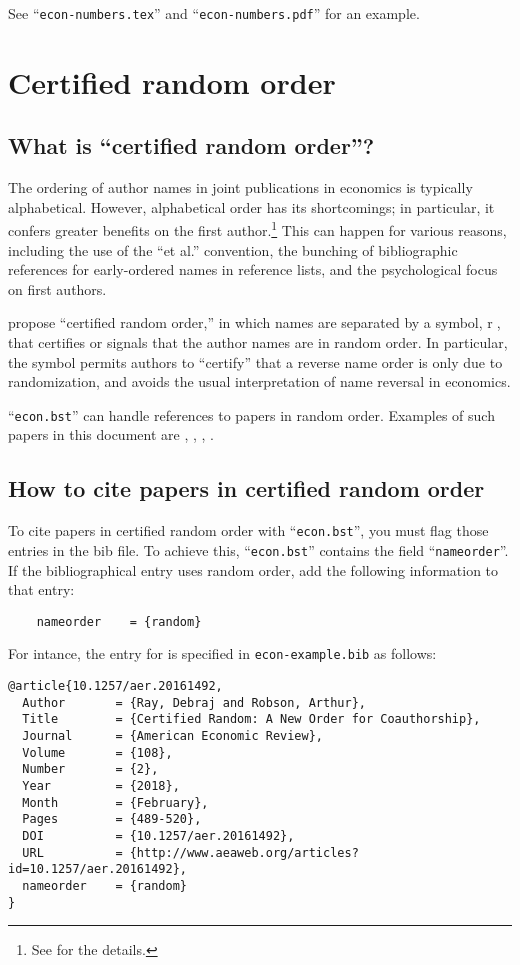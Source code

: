 \documentclass[10pt]{article}
\begin{document}
See ``\texttt{econ-numbers.tex}'' and ``\texttt{econ-numbers.pdf}'' for an example.

\section{Certified random order}
\label{sec:cro}

\subsection{What is ``certified random order''?}

The ordering of author names in joint publications in economics is typically
alphabetical.  However, alphabetical order has its shortcomings; in particular,
it confers greater benefits on the first author.\footnote{See
\citet{10.1257/aer.20161492} for the details.} This can happen for various
reasons, including the use of the ``et al.'' convention, the bunching of
bibliographic references for early-ordered names in reference lists, and the
psychological focus on first authors.

\citet{10.1257/aer.20161492} propose ``certified random order,'' in which names
are separated by a symbol, \textcircled{r}, that certifies or signals that the
author names are in random order. In particular, the symbol permits authors to
``certify'' that a reverse name order is only due to randomization, and avoids
the usual interpretation of name reversal in economics.

``\texttt{econ.bst}'' can handle references to papers in random order. Examples
of such papers in this document are \citet{10.1257/aer.20161492},
\citet{RePEc:hka:wpaper:2018-037}, \citet{vohra18:_maxim_farsig_stabl_set},
\citet{NBERw25205}.


\subsection{How to cite papers in certified random order}

To cite papers in certified random order with ``\texttt{econ.bst}'', you must
flag those entries in the bib file.  To achieve this, ``\texttt{econ.bst}''
contains the field ``\texttt{nameorder}''. If the bibliographical entry uses
random order, add the following information to that entry:
\begin{verbatim}
    nameorder    = {random}
\end{verbatim}

For intance, the entry for \citet{10.1257/aer.20161492} is specified in
\texttt{econ-example.bib} as follows:
\begin{verbatim}
@article{10.1257/aer.20161492,
  Author       = {Ray, Debraj and Robson, Arthur},
  Title        = {Certified Random: A New Order for Coauthorship},
  Journal      = {American Economic Review},
  Volume       = {108},
  Number       = {2},
  Year         = {2018},
  Month        = {February},
  Pages        = {489-520},
  DOI          = {10.1257/aer.20161492},
  URL          = {http://www.aeaweb.org/articles?id=10.1257/aer.20161492},
  nameorder    = {random}
}
\end{verbatim}
\end{document}
